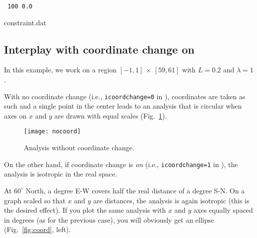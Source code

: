 \begin{exfile}[htpb]
\begin{footnotesize}
\texttt{
100 0.0
} 
\end{footnotesize}
\caption{constraint.dat\label{ex:constraint.dat}}
\end{exfile}





\subsection{Interplay with coordinate change on}

In this example, we work on a region $[-1,1]\, \times\, [59,61]$ with $L=0.2$ and $\lambda=1$.
 
With no coordinate change (i.e., \texttt{icoordchange=0} in ), coordinates are taken as such and
a single point in the center leads to an analysis that is circular when axes on $x$ and $y$ are drawn with equal scales (Fig.~\ref{fig:nocoord}).

\begin{figure}[H]
\centering
\texttt{[image: nocoord]}
\caption{Analysis without coordinate change.\label{fig:nocoord}}
\end{figure}


On the other hand, if coordinate change is \textsl{on} (i.e., \texttt{icoordchange=1} in ), the analysis is isotropic in the real space.

At $60^{\circ}$ North, a degree E-W covers half the real distance of a degree S-N. On a graph scaled so that $x$ and $y$ are distances, the analysis is again isotropic (this is the desired effect). If you plot the same analysis with $x$ and $y$ axes equally spaced in degrees (as for the previous case), you will obviously get an ellipse (Fig.~\ref{fig:coord}, left).


